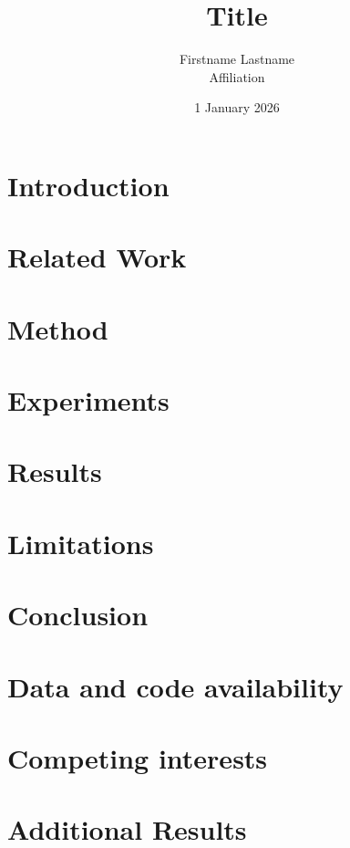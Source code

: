 \documentclass[11pt,a4paper]{article}
\title{\bfseries Title}
\author{Firstname Lastname\\ \small Affiliation}
\date{1 January 2026}
\theoremstyle{plain}
\theoremstyle{definition}
\begin{document}
\maketitle

\begin{abstract}
\end{abstract}

\section{Introduction}
\section{Related Work}
\section{Method}
\section{Experiments}
\section{Results}
\section{Limitations}
\section{Conclusion}

\section*{Data and code availability}

\section*{Competing interests}




\appendix
\section{Additional Results}
\end{document}
